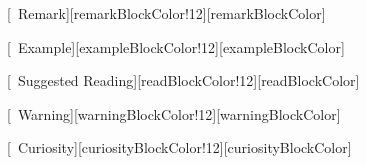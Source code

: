 [\faInfoCircle~Remark][remarkBlockColor!12][remarkBlockColor]
\newcommand{\remarkBlock}[2]{\begin{RemarkBlock}{--- #1}{}#2\end{RemarkBlock}}

[\faChalkboardTeacher~Example][exampleBlockColor!12][exampleBlockColor]
\newcommand{\exampleBlock}[2]{\begin{ExampleBlock}{--- #1}{}#2\end{ExampleBlock}}

[\faReadme~Suggested Reading][readBlockColor!12][readBlockColor]
\newcommand{\readBlock}[2]{\begin{ReadBlock}{--- #1}{}#2\end{ReadBlock}}

[\faExclamationTriangle~Warning][warningBlockColor!12][warningBlockColor]
\newcommand{\warningBlock}[2]{\begin{WarningBlock}{--- #1}{}#2\end{WarningBlock}}

[\faQuestionCircle~Curiosity][curiosityBlockColor!12][curiosityBlockColor]
\newcommand{\curiosityBlock}[2]{\begin{CuriosityBlock}{--- #1}{}#2\end{CuriosityBlock}}




